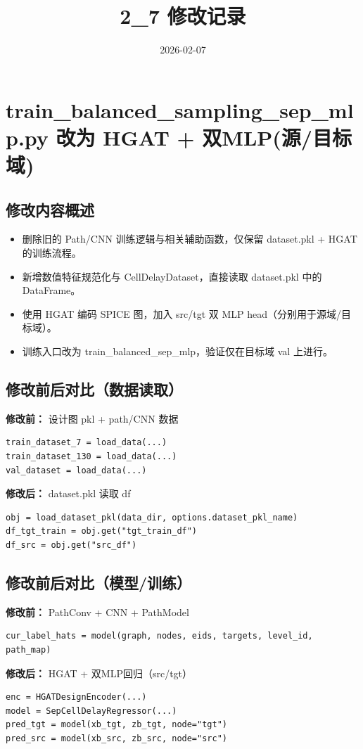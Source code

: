 ﻿\documentclass{ctexart}
\title{2\_7 修改记录}
\date{2026-02-07}
\begin{document}
\maketitle

\section{train\_balanced\_sampling\_sep\_mlp.py 改为 HGAT + 双MLP(源/目标域)}
\subsection{修改内容概述}
\begin{itemize}
  \item 删除旧的 Path/CNN 训练逻辑与相关辅助函数，仅保留 dataset.pkl + HGAT 的训练流程。
  \item 新增数值特征规范化与 CellDelayDataset，直接读取 dataset.pkl 中的 DataFrame。
  \item 使用 HGAT 编码 SPICE 图，加入 src/tgt 双 MLP head（分别用于源域/目标域）。
  \item 训练入口改为 train\_balanced\_sep\_mlp，验证仅在目标域 val 上进行。
\end{itemize}

\subsection{修改前后对比（数据读取）}
\textbf{修改前：} 设计图 pkl + path/CNN 数据
\begin{lstlisting}
train_dataset_7 = load_data(...)
train_dataset_130 = load_data(...)
val_dataset = load_data(...)
\end{lstlisting}

\textbf{修改后：} dataset.pkl 读取 df
\begin{lstlisting}
obj = load_dataset_pkl(data_dir, options.dataset_pkl_name)
df_tgt_train = obj.get("tgt_train_df")
df_src = obj.get("src_df")
\end{lstlisting}

\subsection{修改前后对比（模型/训练）}
\textbf{修改前：} PathConv + CNN + PathModel
\begin{lstlisting}
cur_label_hats = model(graph, nodes, eids, targets, level_id, path_map)
\end{lstlisting}

\textbf{修改后：} HGAT + 双MLP回归（src/tgt）
\begin{lstlisting}
enc = HGATDesignEncoder(...)
model = SepCellDelayRegressor(...)
pred_tgt = model(xb_tgt, zb_tgt, node="tgt")
pred_src = model(xb_src, zb_src, node="src")
\end{lstlisting}
\end{document}
